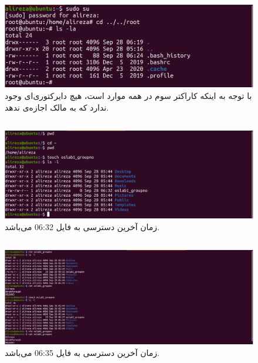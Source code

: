 \documentclass{article}
\begin{document}


\newpage

\section{}

\subsection{}
\begin{figure}[ht]
    \centering
    \includegraphics[width=1.0\textwidth]{figures/1.1.png}
    \caption
	{
با توجه به اینکه کاراکتر سوم در همه موارد
است، هیچ دایرکتوری‌ای وجود ندارد که به مالک اجازه‌ی
ندهد.
	}
    \label{fig:fig1}
\end{figure}

\subsection{}
\begin{figure}[ht]
    \centering
    \includegraphics[width=1.0\textwidth]{figures/1.2.png}
    \caption
	{
زمان آخرین دسترسی به فایل 06:32 می‌باشد.
	}
    \label{fig:fig1}
\end{figure}
\FloatBarrier

\subsection{}
\begin{figure}[ht]
    \centering
    \includegraphics[width=1.0\textwidth]{figures/1.3.png}
    \caption
	{
زمان آخرین دسترسی به فایل 06:35 می‌باشد.
	}
    \label{fig:fig1}
\end{figure}
\FloatBarrier
\end{document}
